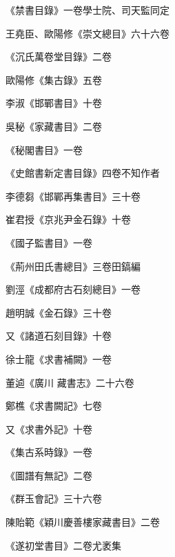 \begin{pinyinscope}
 《禁書目錄》一卷學士院、司天監同定



 王堯臣、歐陽修《崇文總目》六十六卷



 《沉氏萬卷堂目錄》二卷



 歐陽修《集古錄》五卷



 李淑《邯鄲書目》十卷



 吳秘《家藏書目》二卷



 《秘閣書目》一卷



 《史館書新定書目錄》四卷不知作者



 李德芻《邯鄲再集書目》三十卷



 崔君授《京兆尹金石錄》十卷



 《國子監書目》一卷



 《荊州田氏書總目》三卷田鎬編



 劉涇《成都府古石刻總目》一卷



 趙明誠《金石錄》三十卷



 又《諸道石刻目錄》十卷



 徐士龍《求書補闕》一卷



 董逌《廣川
 藏書志》二十六卷



 鄭樵《求書闕記》七卷



 又《求書外記》十卷



 《集古系時錄》一卷



 《圖譜有無記》二卷



 《群玉會記》三十六卷



 陳貽範《穎川慶善樓家藏書目》二卷



 《遂初堂書目》二卷尤袤集




\end{pinyinscope}
